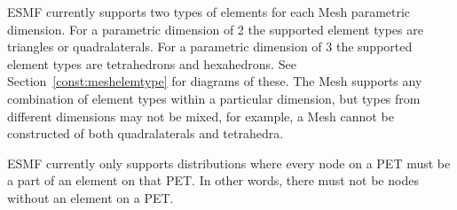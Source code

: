 ESMF currently supports two types of elements for each Mesh parametric dimension. For a parametric dimension of 2 the 
supported element types are triangles or quadralaterals. For a parametric dimension of 3 the supported element types are tetrahedrons
and hexahedrons. See Section~\ref{const:meshelemtype} for diagrams of these. The Mesh supports any combination of element types within a particular
dimension, but types from different dimensions may not be mixed, for example, a Mesh cannot be constructed of both quadralaterals and tetrahedra.

ESMF currently only supports distributions where every node on a PET must be a part of an element on that PET. In other words, there 
must not be nodes without an element on a PET. 

